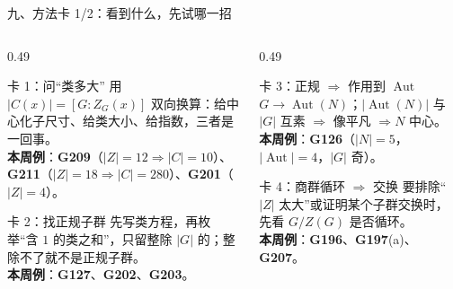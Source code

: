 \documentclass[aspectratio=169,10pt,fontset=none]{ctexbeamer}
\newcommand{\ex}[1]{\textcolor{accent}{\footnotesize\bfseries #1}}
\newcommand{\key}[1]{\textcolor{ink}{\bfseries #1}}
\begin{document}
\begin{frame}[t]{九、方法卡 1/2：看到什么，先试哪一招}
  \label{sec:methods}
  \begin{columns}[T,onlytextwidth]
    \begin{column}{0.49\textwidth}
      \begin{block}{\footnotesize 卡 1：问“类多大”}
        \scriptsize
        用 $|C(x)|=[G:Z_G(x)]$ 双向换算：给中心化子尺寸、给类大小、给指数，三者是一回事。\\
        \key{本周例}：\ex{G209}（$|Z|=12\Rightarrow|C|=10$）、\ex{G211}（$|Z|=18\Rightarrow|C|=280$）、\ex{G201}（$|Z|=4$）。
      \end{block}
      \begin{block}{\footnotesize 卡 2：找正规子群}
        \scriptsize
        先写类方程，再枚举“含 $1$ 的类之和”，只留整除 $|G|$ 的；整除不了就不是正规子群。\\
        \key{本周例}：\ex{G127}、\ex{G202}、\ex{G203}。
      \end{block}
    \end{column}
    \begin{column}{0.49\textwidth}
      \begin{block}{\footnotesize 卡 3：正规 $\Rightarrow$ 作用到 $\operatorname{Aut}$}
        \scriptsize
        $G\to\operatorname{Aut}(N)$；$|\operatorname{Aut}(N)|$ 与 $|G|$ 互素 $\Rightarrow$ 像平凡 $\Rightarrow N$ 中心。\\
        \key{本周例}：\ex{G126}（$|N|=5$，$|\operatorname{Aut}|=4$，$|G|$ 奇）。
      \end{block}
      \begin{block}{\footnotesize 卡 4：商群循环 $\Rightarrow$ 交换}
        \scriptsize
        要排除“$|Z|$ 太大”或证明某个子群交换时，先看 $G/Z(G)$ 是否循环。\\
        \key{本周例}：\ex{G196}、\ex{G197}(a)、\ex{G207}。
      \end{block}
    \end{column}
  \end{columns}
\end{frame}
\end{document}
